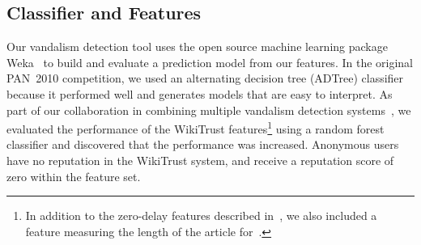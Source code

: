 \newcommand{\sign}{{{\textrm{sign}}}}

\subsection{Classifier and Features}

Our vandalism detection tool uses the open source machine learning
package Weka~\cite{Weka09} to build and evaluate a prediction model from
our features.
In the original PAN~2010 competition, we used an alternating decision
tree (ADTree) classifier~\cite{Adler2010b} because it performed well and
generates models that are easy to interpret.
As part of our collaboration in combining multiple vandalism detection
systems~\cite{Adler2011a}, we evaluated the performance of the
WikiTrust features\footnote{In addition to the zero-delay features
described in~\cite{Adler2010b}, we also included a feature measuring the
length of the article for~\cite{Adler2011a}.}
using a random forest classifier and discovered that the performance was
increased.
Anonymous users have no reputation in the WikiTrust system, and receive
a reputation score of zero within the feature set.

